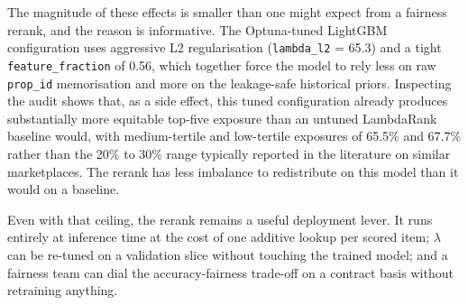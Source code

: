 The magnitude of these effects is smaller than one might expect from a fairness rerank, and the reason is informative. The Optuna-tuned LightGBM configuration uses aggressive L2 regularisation (\texttt{lambda\_l2} = 65.3) and a tight \texttt{feature\_fraction} of 0.56, which together force the model to rely less on raw \texttt{prop\_id} memorisation and more on the leakage-safe historical priors. Inspecting the audit shows that, as a side effect, this tuned configuration already produces substantially more equitable top-five exposure than an untuned LambdaRank baseline would, with medium-tertile and low-tertile exposures of 65.5\% and 67.7\% rather than the 20\% to 30\% range typically reported in the literature on similar marketplaces. The rerank has less imbalance to redistribute on this model than it would on a baseline.

Even with that ceiling, the rerank remains a useful deployment lever. It runs entirely at inference time at the cost of one additive lookup per scored item; $\lambda$ can be re-tuned on a validation slice without touching the trained model; and a fairness team can dial the accuracy-fairness trade-off on a contract basis without retraining anything.
